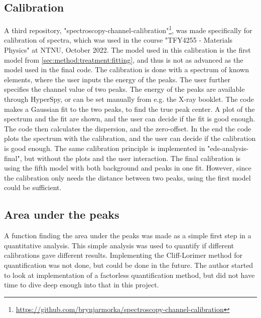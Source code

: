 \subsection{Calibration}
\label{sec:method:treatment:calibration}
A third repository, "spectroscopy-channel-calibration"\footnote{\url{https://github.com/brynjarmorka/spectroscopy-channel-calibration}}, was made specifically for calibration of spectra, which was used in the course "TFY4255 - Materials Physics" at NTNU, October 2022.
The model used in this calibration is the first model from \ref{sec:method:treatment:fitting}, and thus is not as advanced as the model used in the final code.
The calibration is done with a spectrum of known elements, where the user inputs the energy of the peaks.
The user further specifies the channel value of two peaks.
The energy of the peaks are available through HyperSpy, or can be set manually from e.g. the X-ray booklet.
The code makes a Gaussian fit to the two peaks, to find the true peak center.
A plot of the spectrum and the fit are shown, and the user can decide if the fit is good enough.
The code then calculates the dispersion, and the zero-offset.
In the end the code plots the spectrum with the calibration, and the user can decide if the calibration is good enough.
The same calibration principle is implemented in "eds-analysis-final", but without the plots and the user interaction.
The final calibration is using the fifth model with both background and peaks in one fit.
However, since the calibration only needs the distance between two peaks, using the first model could be sufficient.




\subsection{Area under the peaks}
\label{sec:method:treatment:area}
A function finding the area under the peaks was made as a simple first step in a quantitative analysis.
This simple analysis was used to quantify if different calibrations gave different results.
Implementing the Cliff-Lorimer method for quantification was not done, but could be done in the future.
The author started to look at implementation of a factorless quantification method, but did not have time to dive deep enough into that in this project.



